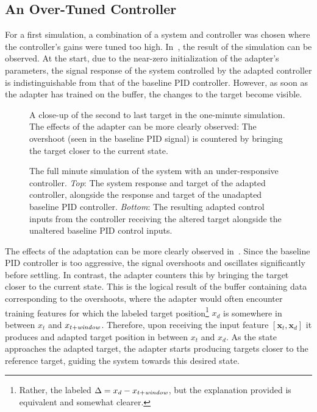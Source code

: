 \subsection{An Over-Tuned Controller}\label{subsec:toy-aggressive}
For a first simulation, a combination of a system and controller was chosen where the controller's gains were tuned too high.
In~, the result of the simulation can be observed.
At the start, due to the near-zero initialization of the adapter's parameters, the signal response of the system controlled by the adapted controller is indistinguishable from that of the baseline PID controller.
However, as soon as the adapter has trained on the buffer, the changes to the target become visible.

\begin{figure}[!htb]
    \centering
    
    \vspace*{-2em}
    \caption{A close-up of the second to last target in the one-minute simulation. The effects of the adapter can be more clearly observed: The overshoot (seen in the baseline PID signal) is countered by bringing the target closer to the current state.}
    \label{fig:toy-plot-closeup}
\end{figure}

\begin{figure}
    \centering
    
    \vspace*{-2em}
    \caption{The full minute simulation of the system with an under-responsive controller. \emph{Top}: The system response and target of the adapted controller, alongside the response and target of the unadapted baseline PID controller.
    \emph{Bottom}: The resulting adapted control inputs from the controller receiving the altered target alongside the unaltered baseline PID control inputs.}
    \label{fig:toy-plot-damped}
\end{figure}

The effects of the adaptation can be more clearly observed in~.
Since the baseline PID controller is too aggressive, the signal overshoots and oscillates significantly before settling.
In contrast, the adapter counters this by bringing the target closer to the current state.
This is the logical result of the buffer containing data corresponding to the overshoots, where the adapter would often encounter training features for which the labeled target position\footnote{Rather, the labeled $\Delta = x_{d} - x_{t+\emph{window}}$, but the explanation provided is equivalent and somewhat clearer.} $x_d$ is somewhere in between $x_t$ and $x_{t+\emph{window}}$.
Therefore, upon receiving the input feature $[\mathbf{x}_t, \mathbf{x}_d]$
it produces and adapted target position in between $x_t$ and $x_d$.
As the state approaches the adapted target, the adapter starts producing targets closer to the reference target, guiding the system towards this desired state.


